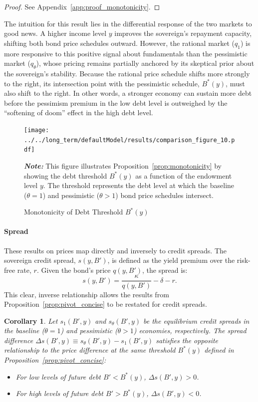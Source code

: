 \documentclass[12pt]{article}
\theoremstyle{plain}
\newtheorem{corollary}{Corollary}
\begin{document}
\begin{proof}
	See Appendix~\ref{app:proof_monotonicity}.
\end{proof}
The intuition for this result lies in the differential response of the two markets to good news. A higher income level $y$ improves the sovereign's repayment capacity, shifting both bond price schedules outward. However, the rational market ($q_1$) is more responsive to this positive signal about fundamentals than the pessimistic market ($q_\theta$), whose pricing remains partially anchored by its skeptical prior about the sovereign's stability. Because the rational price schedule shifts more strongly to the right, its intersection point with the pessimistic schedule, $B^*(y)$, must also shift to the right. In other words, a stronger economy can sustain more debt before the pessimism premium in the low debt level is outweighed by the ``softening of doom'' effect in the high debt level.

\begin{figure}[htb]
	\centering
	\texttt{[image: ../../long\_term/defaultModel/results/comparison\_figure\_10.pdf]}
	\caption{Monotonicity of Debt Threshold $B^*(y)$}
	\label{fig:monotonicity}
	\parbox{\textwidth}{\small\textit{\textbf{Note:} }This figure illustrates Proposition~\ref{prop:monotonicity} by showing the debt threshold $B^*(y)$ as a function of the endowment level $y$. The threshold represents the debt level at which the baseline ($\theta=1$) and pessimistic ($\theta>1$) bond price schedules intersect.}
\end{figure}

\paragraph{Spread}
These results on prices map directly and inversely to credit spreads. The
sovereign credit spread, $s(y, B')$, is defined as the yield premium over the
risk-free rate, $r$. Given the bond's price $q(y, B')$, the spread is:
\begin{equation}
	s(y, B') = \frac{\kappa}{q(y, B')} - \delta - r.
	\label{eq:spread_definition}
\end{equation}
This clear, inverse relationship allows the results from Proposition~\ref{prop:pivot_concise} to be restated for credit spreads.

\begin{corollary}
	\label{cor:spread_pivot}
	Let $s_1(B', y)$ and $s_\theta(B', y)$ be the equilibrium credit spreads in the baseline ($\theta=1$) and pessimistic ($\theta>1$) economies, respectively. The spread difference $\Delta s(B', y) \equiv s_\theta(B', y) - s_1(B', y)$ satisfies the opposite relationship to the price difference at the same threshold $B^*(y)$ defined in Proposition~\ref{prop:pivot_concise}:
	\begin{itemize}
		\item For low levels of future debt $B' < B^*(y)$, $\Delta s(B', y) > 0$.
		\item For high levels of future debt $B' > B^*(y)$, $\Delta s(B', y) < 0$.
	\end{itemize}
\end{corollary}
\end{document}
